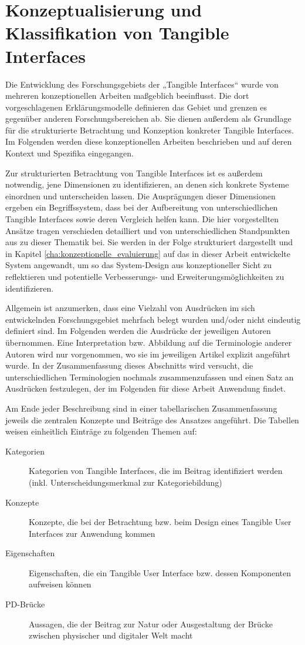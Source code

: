 \section{Konzeptualisierung und Klassifikation von Tangible Interfaces} %
\label{sec:konzeptualisierungen_von_tangible_interfaces}

Die Entwicklung des Forschungsgebiets der „Tangible Interfaces“ wurde von mehreren konzeptionellen Arbeiten maßgeblich beeinflusst. Die dort vorgeschlagenen Erklärungsmodelle definieren das Gebiet und grenzen es gegenüber anderen Forschungsbereichen ab. Sie dienen außerdem als Grundlage für die strukturierte Betrachtung und Konzeption konkreter Tangible Interfaces. Im Folgenden werden diese konzeptionellen Arbeiten beschrieben und auf deren Kontext und Spezifika eingegangen.

Zur strukturierten Betrachtung von Tangible Interfaces ist es außerdem notwendig, jene Dimensionen zu identifizieren, an denen sich konkrete Systeme einordnen und unterscheiden lassen. Die Ausprägungen dieser Dimensionen ergeben ein Begriffssystem, dass bei der Aufbereitung von unterschiedlichen Tangible Interfaces sowie deren Vergleich helfen kann. Die hier vorgestellten Ansätze tragen verschieden detailliert und von unterschiedlichen Standpunkten aus zu dieser Thematik bei. Sie werden in der Folge strukturiert dargestellt und in Kapitel \ref{cha:konzeptionelle_evaluierung} auf das in dieser Arbeit entwickelte System angewandt, um so das System-Design aus konzeptioneller Sicht zu reflektieren und potentielle Verbesserungs- und Erweiterungsmöglichkeiten zu identifizieren.

Allgemein ist anzumerken, dass eine Vielzahl von Ausdrücken im sich entwickelnden Forschungsgebiet mehrfach belegt wurden und/oder nicht eindeutig definiert sind. Im Folgenden werden die Ausdrücke der jeweiligen Autoren übernommen. Eine Interpretation bzw. Abbildung auf die Terminologie anderer Autoren wird nur vorgenommen, wo sie im jeweiligen Artikel explizit angeführt wurde. In der Zusammenfassung dieses Abschnitts wird versucht, die unterschiedlichen Terminologien nochmals zusammenzufassen und einen Satz an Ausdrücken festzulegen, der im Folgenden für diese Arbeit Anwendung findet.

Am Ende jeder Beschreibung sind in einer tabellarischen Zusammenfassung jeweils die zentralen Konzepte und Beiträge des Ansatzes angeführt. Die Tabellen weisen einheitlich Einträge zu folgenden Themen auf:
\begin{description}
 \item[Kategorien] Kategorien von Tangible Interfaces, die im Beitrag identifiziert werden  (inkl. Unterscheidungsmerkmal zur Kategoriebildung)
 \item[Konzepte] Konzepte, die bei der Betrachtung bzw. beim Design eines Tangible User Interfaces zur Anwendung kommen 
 \item[Eigenschaften] Eigenschaften, die ein Tangible User Interface bzw. dessen Komponenten aufweisen können
 \item[PD-Brücke] Aussagen, die der Beitrag zur Natur oder Ausgestaltung der Brücke zwischen physischer und digitaler Welt macht
\end{description}

